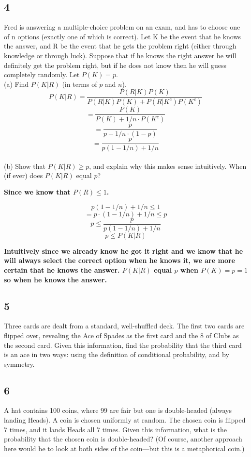 \documentclass{article}
\begin{document}
\subsection{4}Fred is answering a multiple-choice problem on an exam, and has to choose one of n options (exactly one of which is correct). Let K be the event that he knows the answer, and R be the event that he gets the problem right (either through knowledge or through luck). Suppose that if he knows the right answer he will definitely get the problem right, but if he does not know then he will guess completely randomly. Let $P (K) = p$.\\
(a) Find $P(K|R)$ (in terms of $p$ and $n$).
 $$P(K|R)=\frac{P(R|K)P(K)}{P(R|K)P(K)+P(R|K^c)P(K^c)}$$
 $$=\frac{P(K)}{P(K)+1/n\cdot P(K^c)}$$
 $$=\frac{p}{p+1/n\cdot(1-p)}$$
 $$=\frac{p}{p(1-1/n)+1/n}$$
\\
(b) Show that $P(K|R) \geq p$, and explain why this makes sense intuitively. When (if ever)
does $P(K|R)$ equal $p$?

\textbf{Since we know that $P(R)\leq 1$.}

$$p(1-1/n)+1/n \leq 1$$
$$=p \cdotp(1-1/n)+1/n \leq p$$
$$p \leq \frac{p}{p(1-1/n)+1/n}$$
$$p \leq P(K|R)$$

\textbf{Intuitively since we already know he got it right and we know that he will always select the correct option when he knows it, we are more certain that he knows the answer.  $P(K|R)$ equal $p$ when $P(K)=p=1$ so when he knows the answer.}
\subsection{5}Three cards are dealt from a standard, well-shuffled deck. The first two cards are flipped over, revealing the Ace of Spades as the first card and the 8 of Clubs as the second card. Given this information, find the probability that the third card is an ace in two ways: using the definition of conditional probability, and by symmetry.
\subsection{6}A hat contains 100 coins, where 99 are fair but one is double-headed (always landing Heads). A coin is chosen uniformly at random. The chosen coin is flipped 7 times, and it lands Heads all 7 times. Given this information, what is the probability that the chosen coin is double-headed? (Of course, another approach here would be to look at both sides of the coin—but this is a metaphorical coin.)
\end{document}
